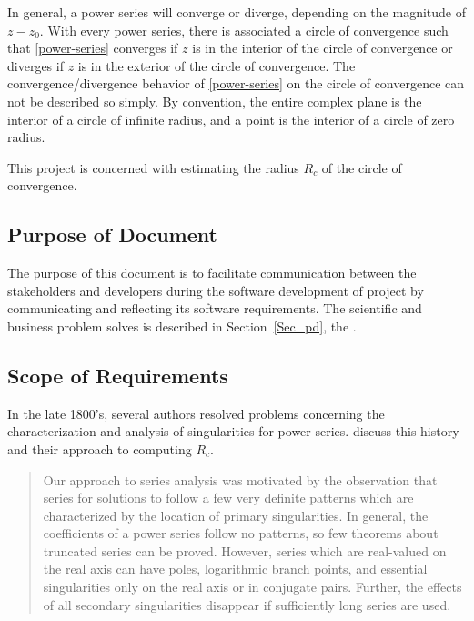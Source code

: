 \documentclass[12pt]{article}
\begin{document}
In general, a power series will converge or diverge, depending on the magnitude of $z-z_0$.
With every power series, there is associated a circle of convergence such that
\eqref{power-series} converges if $z$ is in the interior of the circle of convergence or
diverges if $z$ is in the exterior of the circle of convergence. The convergence/divergence
behavior of \eqref{power-series} on the circle of convergence can not be described so simply.
By convention, the entire complex plane is the interior of a circle of infinite radius, and a
point is the interior of a circle of zero radius.

This project is concerned with estimating the radius $R_c$ of the circle of convergence.

\subsection{Purpose of Document}

The purpose of this document is to facilitate communication between the stakeholders and developers
 during the software development of project 
 by communicating and reflecting its software requirements.
The scientific and business problem  solves is described in
Section~\ref{Sec_pd}, the . 

\subsection{Scope of Requirements}\label{sc:scope}

In the late 1800's, several authors resolved problems
concerning the characterization and analysis of singularities for power series.
\cite{chang1982} discuss this history and their approach to computing $R_c$.

\begin{quote}
Our approach to series analysis was motivated by the observation that series
for solutions to  follow a few very definite patterns which are characterized
by the location of primary singularities. In general, the coefficients of a power
series follow no patterns, so few theorems about truncated series can be proved.
However, series which are real-valued on the real axis can have poles, logarithmic
branch points, and essential singularities only on the real axis or in conjugate pairs.
Further, the effects of all secondary singularities disappear if sufficiently
  long series are used.  \citep[p.~122]{chang1982}
\end{quote}
\end{document}
